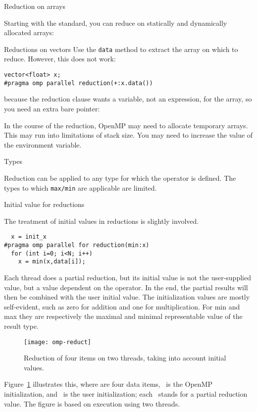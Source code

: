  {Reduction on arrays}
\label{sec:omp-array-reduct}

Starting with the  standard, you can reduce
on statically and dynamically allocated arrays:

\begin{cppnote}{Reductions on vectors}
  Use the \lstinline{data} method to extract the array
  on which to reduce. However, this does not work:
\begin{lstlisting}
vector<float> x;
#pragma omp parallel reduction(+:x.data())
\end{lstlisting}
  because the reduction clause wants a variable, not an expression,
  for the array, so you need an extra bare pointer:
\end{cppnote}

In the course of the reduction, OpenMP may need to allocate
temporary arrays. This may run into limitations of stack size.
You may need to increase the value of the 
environment variable.

 {Types}

Reduction can be applied to any type for which the operator is defined.
The types to which \lstinline{max/min} are applicable are limited.

 {Initial value for reductions}

The treatment of initial values in reductions is slightly involved.
\begin{lstlisting}
  x = init_x
#pragma omp parallel for reduction(min:x)
  for (int i=0; i<N; i++)
    x = min(x,data[i]);
\end{lstlisting}
Each thread does a partial reduction, but its initial value is not the
user-supplied  value, but a value dependent on the
operator. In the end, the partial results will then be combined with
the user initial value.
The initialization values are mostly self-evident, such as zero for
addition and one for multiplication. For min and max they are
respectively the maximal and minimal representable value of the result type.

\begin{figure}[ht]
  \texttt{[image: omp-reduct]}
  \caption{Reduction of four items on two threads, taking into account
    initial values.}
  \label{fig:omp-reduct}  
\end{figure}
%
Figure~\ref{fig:omp-reduct} illustrates this, where  are
four data items, ~is the OpenMP initialization, and ~is the
user initialization; each ~stands for a partial reduction value.
The figure is based on execution using two threads.

